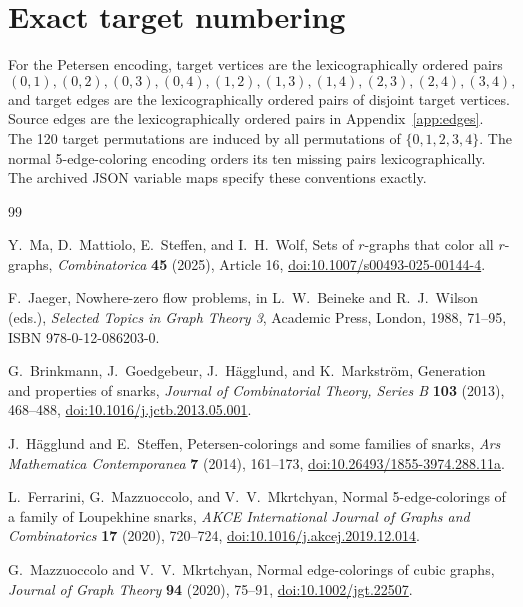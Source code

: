 \documentclass[11pt]{article}
\begin{document}
\section{Exact target numbering}\label{app:numbering}

For the Petersen encoding, target vertices are the lexicographically ordered
pairs
\[
(0,1),(0,2),(0,3),(0,4),(1,2),(1,3),(1,4),(2,3),(2,4),(3,4),
\]
and target edges are the lexicographically ordered pairs of disjoint target
vertices.  Source edges are the lexicographically ordered pairs in
Appendix~\ref{app:edges}.  The 120 target permutations are induced by all
permutations of \(\{0,1,2,3,4\}\).  The normal 5-edge-coloring encoding orders
its ten missing pairs lexicographically.  The archived JSON variable maps
specify these conventions exactly.

\clearpage
\begin{thebibliography}{99}

Y.~Ma, D.~Mattiolo, E.~Steffen, and I.~H.~Wolf,
Sets of \(r\)-graphs that color all \(r\)-graphs,
\emph{Combinatorica} \textbf{45} (2025), Article 16,
\href{https://doi.org/10.1007/s00493-025-00144-4}{doi:10.1007/s00493-025-00144-4}.

F.~Jaeger,
Nowhere-zero flow problems,
in L.~W.~Beineke and R.~J.~Wilson (eds.),
\emph{Selected Topics in Graph Theory 3}, Academic Press, London, 1988,
71--95, ISBN 978-0-12-086203-0.

G.~Brinkmann, J.~Goedgebeur, J.~H\"agglund, and K.~Markstr\"om,
Generation and properties of snarks,
\emph{Journal of Combinatorial Theory, Series B} \textbf{103} (2013),
468--488,
\href{https://doi.org/10.1016/j.jctb.2013.05.001}{doi:10.1016/\allowbreak j.jctb.2013.05.001}.

J.~H\"agglund and E.~Steffen,
Petersen-colorings and some families of snarks,
\emph{Ars Mathematica Contemporanea} \textbf{7} (2014), 161--173,
\href{https://doi.org/10.26493/1855-3974.288.11a}{doi:10.26493/1855-3974.288.11a}.

L.~Ferrarini, G.~Mazzuoccolo, and V.~V.~Mkrtchyan,
Normal 5-edge-colorings of a family of Loupekhine snarks,
\emph{AKCE International Journal of Graphs and Combinatorics}
\textbf{17} (2020), 720--724,
\href{https://doi.org/10.1016/j.akcej.2019.12.014}{doi:10.1016/j.akcej.2019.12.014}.

G.~Mazzuoccolo and V.~V.~Mkrtchyan,
Normal edge-colorings of cubic graphs,
\emph{Journal of Graph Theory} \textbf{94} (2020), 75--91,
\href{https://doi.org/10.1002/jgt.22507}{doi:10.1002/jgt.22507}.


\end{thebibliography}
\end{document}
